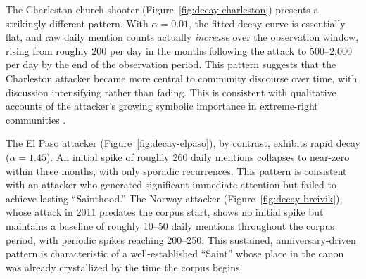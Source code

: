 \documentclass[12pt]{article}
\begin{document}
The Charleston church shooter (Figure~\ref{fig:decay-charleston}) presents a strikingly different pattern. With $\alpha = 0.01$, the fitted decay curve is essentially flat, and raw daily mention counts actually \textit{increase} over the observation window, rising from roughly 200 per day in the months following the attack to 500--2,000 per day by the end of the observation period. This pattern suggests that the Charleston attacker became more central to community discourse over time, with discussion intensifying rather than fading. This is consistent with qualitative accounts of the attacker's growing symbolic importance in extreme-right communities \parencite{macklin2022praise, berntzen2021monster}.

The El Paso attacker (Figure~\ref{fig:decay-elpaso}), by contrast, exhibits rapid decay ($\alpha = 1.45$). An initial spike of roughly 260 daily mentions collapses to near-zero within three months, with only sporadic recurrences. This pattern is consistent with an attacker who generated significant immediate attention but failed to achieve lasting ``Sainthood.'' The Norway attacker (Figure~\ref{fig:decay-breivik}), whose attack in 2011 predates the corpus start, shows no initial spike but maintains a baseline of roughly 10--50 daily mentions throughout the corpus period, with periodic spikes reaching 200--250. This sustained, anniversary-driven pattern is characteristic of a well-established ``Saint'' whose place in the canon was already crystallized by the time the corpus begins.
\end{document}
